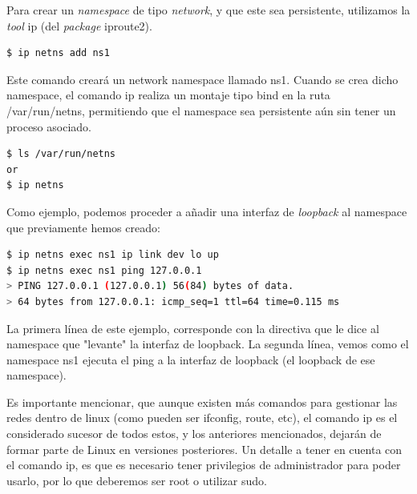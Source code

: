 \documentclass[a4paper, oneside, 12pt]{book}
\begin{document}
	\par \noindent Para crear un \textit{namespace} de tipo \textit{network}, y que este sea persistente, utilizamos la \textit{tool} ip (del \textit{package} iproute2).
	\begin{lstlisting}[language=bash, caption=Creation persistent network namespace]
$ ip netns add ns1
	\end{lstlisting}

	\par \noindent Este comando creará un network namespace llamado ns1. Cuando se crea dicho namespace, el comando ip realiza un montaje tipo bind en la ruta /var/run/netns, permitiendo que el namespace sea persistente aún sin tener un proceso asociado.
	\begin{lstlisting}[language=bash, caption=Comprobar network namespaces existentes]
$ ls /var/run/netns
or
$ ip netns
	\end{lstlisting}
	
	\addvspace{10px}

	\par \noindent Como ejemplo, podemos proceder a añadir una interfaz de \textit{loopback} al namespace que previamente hemos creado:
	\begin{lstlisting}[language=bash, caption=Asignar interfaz loopback a un namespace]
$ ip netns exec ns1 ip link dev lo up
$ ip netns exec ns1 ping 127.0.0.1
> PING 127.0.0.1 (127.0.0.1) 56(84) bytes of data. 
> 64 bytes from 127.0.0.1: icmp_seq=1 ttl=64 time=0.115 ms
	\end{lstlisting}

	\par \noindent La primera línea de este ejemplo, corresponde con la directiva que le dice al namespace que "levante" la interfaz de loopback. La segunda línea, vemos como el namespace ns1 ejecuta el ping a la interfaz de loopback (el loopback de ese namespace).
	
	\addvspace{10px}
	
	\par \noindent Es importante mencionar, que aunque existen más comandos para gestionar las redes dentro de linux (como pueden ser ifconfig, route, etc), el comando ip es el considerado sucesor de todos estos, y los anteriores mencionados, dejarán de formar parte de Linux en versiones posteriores. Un detalle a tener en cuenta con el comando ip, es que es necesario tener privilegios de administrador para poder usarlo, por lo que deberemos ser root o utilizar sudo.
	
	\addvspace{10px}
	
\end{document}
